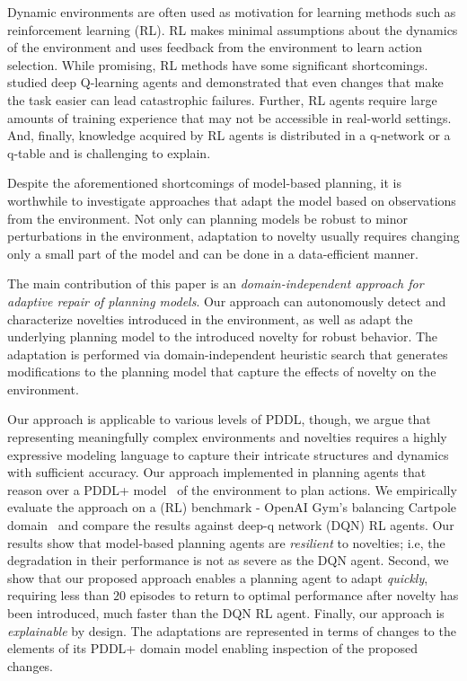 \documentclass[letterpaper]{article} %
\begin{document}
Dynamic environments are often used as motivation for learning methods such as reinforcement learning (RL). RL makes minimal assumptions about the dynamics of the environment and uses feedback from the environment to learn action selection. While promising, RL methods have some significant shortcomings. \citet{witty2018measuring} studied deep Q-learning agents and demonstrated that even changes that make the task easier can lead catastrophic failures. Further, RL agents require large amounts of training experience that may not be accessible in real-world settings. And, finally, knowledge acquired by RL agents is distributed in a q-network or a q-table and is challenging to explain.



Despite the aforementioned shortcomings of model-based planning, it is worthwhile to investigate approaches that adapt the model based on observations from the environment. Not only can planning models be robust to minor perturbations in the environment, adaptation to novelty usually requires changing only a small part of the model and can be done in a data-efficient manner.

The main contribution of this paper is an \emph{domain-independent approach for adaptive repair of planning models}. Our approach can autonomously detect and characterize novelties introduced in the environment, as well as adapt the underlying planning model to the introduced novelty for robust behavior. The adaptation is performed via domain-independent heuristic search that generates modifications to the planning model that capture the effects of novelty on the environment.

Our approach is applicable to various levels of PDDL, though, we argue that representing meaningfully complex environments and novelties requires a highly expressive modeling language to capture their intricate structures and dynamics with sufficient accuracy. Our approach implemented in planning agents that reason over a PDDL+ model~\cite{fox2006modelling} of the environment to plan actions.
We empirically evaluate the approach on a (RL) benchmark - OpenAI Gym's balancing Cartpole domain~\cite{barto1983neuronlike,brockman2016openai} and compare the results against deep-q network (DQN) RL agents. Our results show that model-based planning agents are \emph{resilient} to novelties; i.e, the degradation in their performance is not as severe as the DQN agent. Second, we show that our proposed approach enables a planning agent to adapt \emph{quickly}, requiring less than $20$ episodes to return to optimal performance after novelty has been introduced, much faster than the DQN RL agent. Finally, our approach is  \emph{explainable} by design. The adaptations are represented in terms of changes to the elements of its PDDL+ domain model enabling inspection of the proposed changes.
\end{document}
